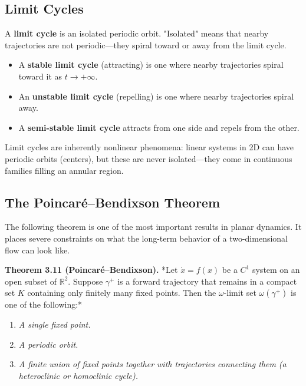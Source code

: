 \subsection{Limit Cycles}\label{sec:3.6.1}

A \textbf{limit cycle} is an isolated periodic orbit. "Isolated" means that nearby trajectories are not periodic---they spiral toward or away from the limit cycle.

\begin{itemize}[nosep]
  \item A \textbf{stable limit cycle} (attracting) is one where nearby trajectories spiral toward it as $t \to +\infty$.
  \item An \textbf{unstable limit cycle} (repelling) is one where nearby trajectories spiral away.
  \item A \textbf{semi-stable limit cycle} attracts from one side and repels from the other.
\end{itemize}

Limit cycles are inherently nonlinear phenomena: linear systems in 2D can have periodic orbits (centers), but these are never isolated---they come in continuous families filling an annular region.

\subsection{The Poincar\'e--Bendixson Theorem}\label{sec:3.6.2}

The following theorem is one of the most important results in planar dynamics. It places severe constraints on what the long-term behavior of a two-dimensional flow can look like.

\textbf{Theorem 3.11 (Poincar\'e--Bendixson).} *Let $\dot{x} = f(x)$ be a $C^1$ system on an open subset of $\mathbb{R}^2$. Suppose $\gamma^+$ is a forward trajectory that remains in a compact set $K$ containing only finitely many fixed points. Then the $\omega$-limit set $\omega(\gamma^+)$ is one of the following:*

\begin{enumerate}[nosep]
  \item \textit{A single fixed point.}
  \item \textit{A periodic orbit.}
  \item \textit{A finite union of fixed points together with trajectories connecting them (a heteroclinic or homoclinic cycle).}
\end{enumerate}

